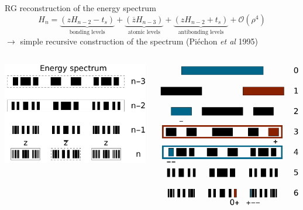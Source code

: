 \documentclass[xcolor=x11names,compress,professionalfonts]{beamer}
\renewcommand{\(}{\begin{columns}}
\renewcommand{\)}{\end{columns}}
\newcommand{\<}[1]{\begin{column}{#1}}
\renewcommand{\>}{\end{column}}
\newcommand{\zb}{\ensuremath{\overline{z}}}
\begin{document}
\begin{frame}{RG reconstruction of the energy spectrum}
 \[ H_n = \underbrace{\left( z H_{n-2} - t_s \right)}_{\text{bonding levels}} + \underbrace{\left( \zb H_{n-3} \right)}_{\text{atomic levels}} + \underbrace{\left( z H_{n-2} + t_s \right)}_{\text{antibonding levels}} + \mathcal{O}(\rho^4)\]
	$\rightarrow$ simple recursive construction of the spectrum (Piéchon \emph{et al} 1995)
	
	\begin{columns}
	\begin{column}{6cm}
	\centering
	\includegraphics[scale=.4]{recursive_construction_spectrum.pdf}
	\end{column}
	\begin{column}{6cm}
	\includegraphics[scale=.3]{renormalization_paths_spectrum.pdf}

\end{column}
\end{columns}
\end{frame}
\end{document}
